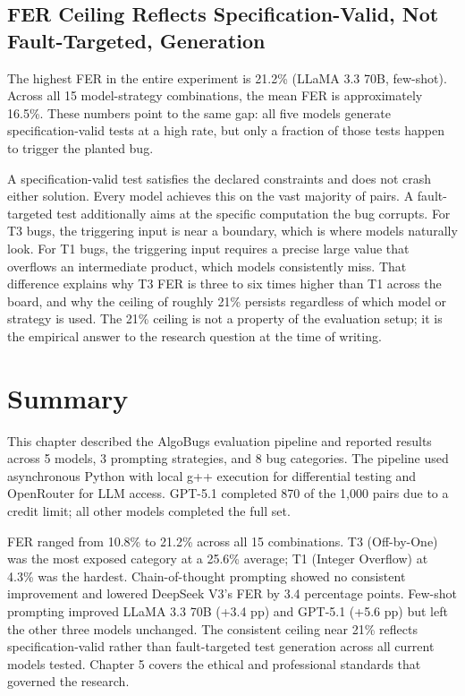 \subsection{FER Ceiling Reflects Specification-Valid, Not Fault-Targeted, Generation}

The highest FER in the entire experiment is 21.2\% (LLaMA 3.3 70B, few-shot). Across all 15 model-strategy combinations, the mean FER is approximately 16.5\%. These numbers point to the same gap: all five models generate specification-valid tests at a high rate, but only a fraction of those tests happen to trigger the planted bug.

A specification-valid test satisfies the declared constraints and does not crash either solution. Every model achieves this on the vast majority of pairs. A fault-targeted test additionally aims at the specific computation the bug corrupts. For T3 bugs, the triggering input is near a boundary, which is where models naturally look. For T1 bugs, the triggering input requires a precise large value that overflows an intermediate product, which models consistently miss. That difference explains why T3 FER is three to six times higher than T1 across the board, and why the ceiling of roughly 21\% persists regardless of which model or strategy is used. The 21\% ceiling is not a property of the evaluation setup; it is the empirical answer to the research question at the time of writing.

\section{Summary}

This chapter described the AlgoBugs evaluation pipeline and reported results across 5 models, 3 prompting strategies, and 8 bug categories. The pipeline used asynchronous Python with local g++ execution for differential testing and OpenRouter for LLM access. GPT-5.1 completed 870 of the 1,000 pairs due to a credit limit; all other models completed the full set.

FER ranged from 10.8\% to 21.2\% across all 15 combinations. T3 (Off-by-One) was the most exposed category at a 25.6\% average; T1 (Integer Overflow) at 4.3\% was the hardest. Chain-of-thought prompting showed no consistent improvement and lowered DeepSeek V3's FER by 3.4 percentage points. Few-shot prompting improved LLaMA 3.3 70B (+3.4 pp) and GPT-5.1 (+5.6 pp) but left the other three models unchanged. The consistent ceiling near 21\% reflects specification-valid rather than fault-targeted test generation across all current models tested. Chapter 5 covers the ethical and professional standards that governed the research.
